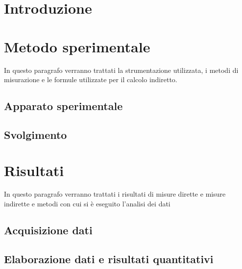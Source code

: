 \documentclass[a4paper,12pt,italian]{article}
\begin{document}


\newpage

\section*{Introduzione}



\section{Metodo sperimentale}
In questo paragrafo verranno trattati la strumentazione utilizzata, i metodi di misurazione e le formule utilizzate per il calcolo indiretto.

    \subsection{Apparato sperimentale}

    

    \subsection{Svolgimento}
    
    

\newpage
\section{Risultati}
In questo paragrafo verranno trattati i risultati di misure dirette e misure indirette e metodi con cui si è eseguito l'analisi dei dati

    \subsection{Acquisizione dati}
    
    
    

    \subsection{Elaborazione dati e risultati quantitativi}
    
\end{document}
